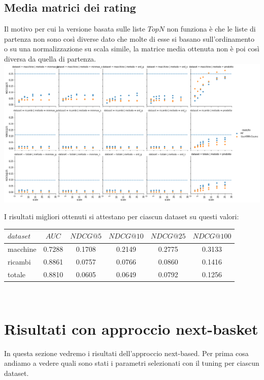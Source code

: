 \subsection{Media matrici dei rating}
Il motivo per cui la versione basata sulle liste $TopN$ non funziona è che le liste di partenza non sono così diverse dato che molte di esse si basano sull'ordinamento o su una normalizzazione su scala simile, la matrice media ottenuta non è poi così diversa da quella di partenza.\\

\includegraphics[width=16cm]{figures/comb_2.png}

I risultati migliori ottenuti si attestano per ciascun dataset su questi valori:\\

\begin{tabular}{|l|ccccc|}
    \toprule
    $dataset$  & $AUC$ & $NDCG@5$ & $NDCG@10$  & $NDCG@25$ & $NDCG@100$  \\
    \midrule
    macchine & 0.7288 & 0.1708 & 0.2149 & 0.2775 & 0.3133 \\
    ricambi & 0.8861  & 0.0757 & 0.0766 & 0.0860 & 0.1416 \\
    totale  & 0.8810  & 0.0605 & 0.0649 & 0.0792 & 0.1256 \\
\bottomrule
\end{tabular}\\

\section{Risultati con approccio next-basket}
In questa sezione vedremo i risultati dell'approccio next-based. Per prima cosa andiamo a vedere quali sono stati i parametri selezionati con il tuning per ciascun dataset.\\

